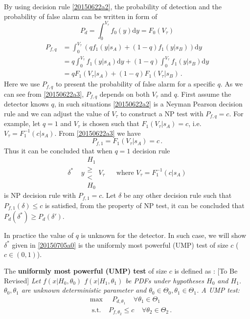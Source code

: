 By using decision rule \eqref{20150622a2}, the probability of detection and the probability of false alarm can be written in form of 
\begin{equation}
  P_d = \int_{0}^{V_\tau} f_0(y) \mathrm{d}y = F_0(V_\tau)
  \label{20150701a3}
\end{equation}
\begin{equation}
  \begin{split}
  P_{f,q} &= \int_{0}^{V_\tau} (qf_1(y|s_A) + (1-q)f_1(y|s_B))\mathrm{d}y\\
  &= q\int_{0}^{V_\tau} f_1(y|s_A)\mathrm{d}y  + (1-q)\int_0^{V_\tau}f_1(y|s_B)\mathrm{d}y\\
      &= qF_1(V_\tau|s_A) + (1-q)F_1(V_\tau|s_B)\,.
    \end{split}
    \label{20150622a3}
  \end{equation}
  Here we use $P_{f,q}$ to present the probability of false alarm for a specific $q$.
  As we can see from \eqref{20150622a3},  $P_{f,q}$ depends on both $V_\tau$ and $q$.  
  First assume the detector knows $q$, in such situations \eqref{20150622a2} is a Neyman Pearson decision rule and  we can adjust the value of $V_\tau$ to construct a NP test with $P_{f,q} = c$.
  For example, let $q = 1$ and $V_\tau$ is chosen such that $F_1(V_\tau|s_A) = c$, i.e. $V_\tau = F_1^{-1}(c|s_A)$. From \eqref{20150622a3} we have 
\begin{equation}
  P_{f,1} = F_1(V_\tau|s_A) = c\,.
  \label{20150623a0}
\end{equation}
Thus it can be concluded that when $q = 1$ decision rule 
\begin{equation}
\delta^\ast \;\;\;\;y \substack{H_1 \\ \geq \\ < \\ H_0} V_\tau\;\;\;\;\;\;\text{where $V_\tau = F_1^{-1}(c|s_A)$}
\label{20150705a0}
\end{equation}
is NP decision rule with  $P_{f, 1} = c$. Let $\delta$ be any other decision rule such that $P_{f, 1}(\delta) \leq c$ is satisfied, from the property of NP test, it can be concluded that $P_d(\delta^\ast) \geq P_d(\delta')$.  

In practice the value of $q$ is unknown for the detector. In such case, we will show $ \delta^\ast$ given in \eqref{20150705a0} is the uniformly most powerful (UMP) test of size $c$ ($c \in (0, 1)$). 
 
 The \textbf{uniformly most powerful (UMP) test} of size $c$ is defined as \cite{LehmannTest}:
[To Be Revised]
\textit{
Let $f(x|H_0, \theta_0)$ $f(x|H_1, \theta_1)$ be PDFs under hypotheses $H_0$ and $H_1$. $\theta_0, \theta_1$ are unknown deterministic parameter and $\theta_0 \in \Theta_0, \theta_1 \in \Theta_1$. A UMP test:}
  \begin{equation}
    \begin{split}
      &\max\;\;\;\;P_{d,\theta_1}\;\;\;\;\forall \theta_1 \in \Theta_1\\
      &\;\;\text{s.t.}\;\;\;\;P_{f,\theta_2} \leq c\;\;\;\;\forall \theta_2 \in \Theta_2\,.
    \end{split}
    \label{20150701a1}
  \end{equation}


